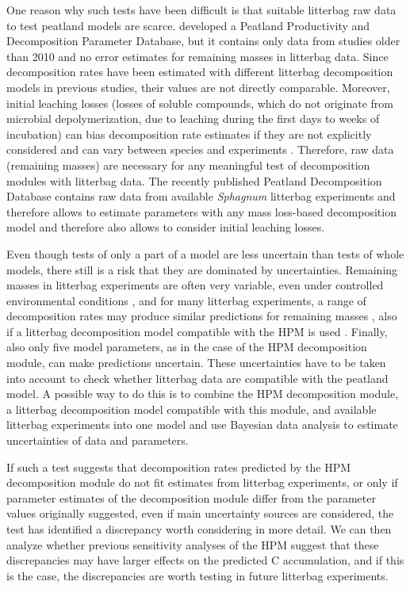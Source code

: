 \documentclass[esd, manuscript]{copernicus}
\begin{document}
One reason why such tests have been difficult is that suitable litterbag raw data to test peatland models are scarce. \citet{Bona.2018} developed a Peatland Productivity and Decomposition Parameter Database, but it contains only data from studies older than 2010 and no error estimates for remaining masses in litterbag data. Since decomposition rates have been estimated with different litterbag decomposition models in previous studies, their values are not directly comparable. Moreover, initial leaching losses (losses of soluble compounds, which do not originate from microbial depolymerization, due to leaching during the first days to weeks of incubation) can bias decomposition rate estimates if they are not explicitly considered and can vary between species and experiments \citep{Yu.2001, Teickner.2025}. Therefore, raw data (remaining masses) are necessary for any meaningful test of decomposition modules with litterbag data. The recently published Peatland Decomposition Database \citep{Teickner.2024c} contains raw data from available \emph{Sphagnum} litterbag experiments and therefore allows to estimate parameters with any mass loss-based decomposition model and therefore also allows to consider initial leaching losses.

Even though tests of only a part of a model are less uncertain than tests of whole models, there still is a risk that they are dominated by uncertainties. Remaining masses in litterbag experiments are often very variable, even under controlled environmental conditions \citep[e.g.,][]{Bengtsson.2018}, and for many litterbag experiments, a range of decomposition rates may produce similar predictions for remaining masses \citep[e.g.,][]{Yu.2001}, also if a litterbag decomposition model compatible with the HPM is used \citep{Teickner.2025}. Finally, also only five model parameters, as in the case of the HPM decomposition module, can make predictions uncertain. These uncertainties have to be taken into account to check whether litterbag data are compatible with the peatland model. A possible way to do this is to combine the HPM decomposition module, a litterbag decomposition model compatible with this module, and available litterbag experiments into one model and use Bayesian data analysis \citep{Gelman.2014} to estimate uncertainties of data and parameters.

If such a test suggests that decomposition rates predicted by the HPM decomposition module do not fit estimates from litterbag experiments, or only if parameter estimates of the decomposition module differ from the parameter values originally suggested, even if main uncertainty sources are considered, the test has identified a discrepancy worth considering in more detail. We can then analyze whether previous sensitivity analyses of the HPM suggest that these discrepancies may have larger effects on the predicted C accumulation, and if this is the case, the discrepancies are worth testing in future litterbag experiments.
\end{document}

